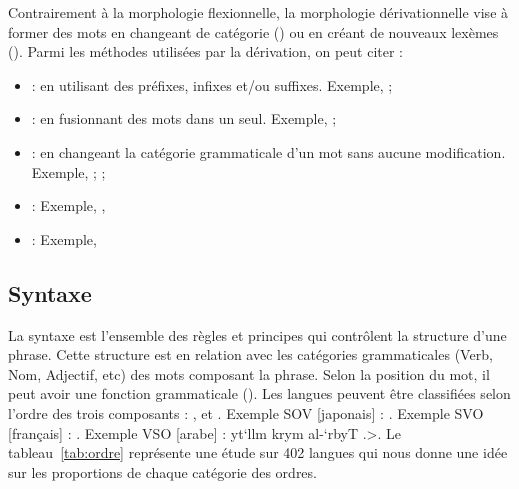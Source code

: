 \documentclass{KodeBook}
\begin{document}
Contrairement à la morphologie flexionnelle, la morphologie dérivationnelle vise à former des mots en changeant de catégorie () ou en créant de nouveaux lexèmes (). 
Parmi les méthodes utilisées par la dérivation, on peut citer :
\begin{itemize}
	\item {} : en utilisant des préfixes, infixes et/ou suffixes. 
	Exemple, ; 
	
	\item {} : en fusionnant des mots dans un seul. 
	Exemple, ; 
	
	\item {} : en changeant la catégorie grammaticale d'un mot sans aucune modification. 
	Exemple, ; ; 
	
	\item {} : 
	Exemple, , 
	
	\item {} : Exemple,  
	
\end{itemize}

\subsection{Syntaxe}

La syntaxe est l'ensemble des règles et principes qui contrôlent la structure d'une phrase. 
Cette structure est en relation avec les catégories grammaticales (Verb, Nom, Adjectif, etc) des mots composant la phrase.
Selon la position du mot, il peut avoir une fonction grammaticale ().
Les langues peuvent être classifiées selon l'ordre des trois composants : ,  et .
Exemple SOV [japonais] : .
Exemple SVO [français] : .
Exemple VSO [arabe] : \<yt`llm \LR{[V]} krym \LR{[S]} al-`rbyT \LR{[O]}.>.
Le tableau~\ref{tab:ordre} représente une étude sur 402 langues qui nous donne une idée sur les proportions de chaque catégorie des ordres.
\end{document}
